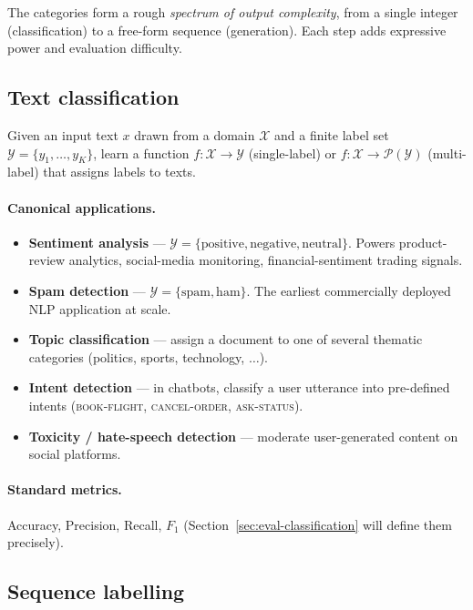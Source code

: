 The categories form a rough \emph{spectrum of output complexity}, from a single integer (classification) to a free-form sequence (generation). Each step adds expressive power and evaluation difficulty.

\subsection{Text classification}

\begin{definition}
Given an input text $x$ drawn from a domain $\mathcal{X}$ and a finite label set $\mathcal{Y} = \{y_1, \dots, y_K\}$, learn a function $f : \mathcal{X} \to \mathcal{Y}$ (single-label) or $f : \mathcal{X} \to \mathcal{P}(\mathcal{Y})$ (multi-label) that assigns labels to texts.
\end{definition}

\paragraph{Canonical applications.}
\begin{itemize}
    \item \textbf{Sentiment analysis} --- $\mathcal{Y} = \{\text{positive}, \text{negative}, \text{neutral}\}$. Powers product-review analytics, social-media monitoring, financial-sentiment trading signals.
    \item \textbf{Spam detection} --- $\mathcal{Y} = \{\text{spam}, \text{ham}\}$. The earliest commercially deployed NLP application at scale.
    \item \textbf{Topic classification} --- assign a document to one of several thematic categories (politics, sports, technology, $\ldots$).
    \item \textbf{Intent detection} --- in chatbots, classify a user utterance into pre-defined intents (\textsc{book-flight}, \textsc{cancel-order}, \textsc{ask-status}).
    \item \textbf{Toxicity / hate-speech detection} --- moderate user-generated content on social platforms.
\end{itemize}

\paragraph{Standard metrics.} Accuracy, Precision, Recall, $F_1$ (Section~\ref{sec:eval-classification} will define them precisely).

\subsection{Sequence labelling}

